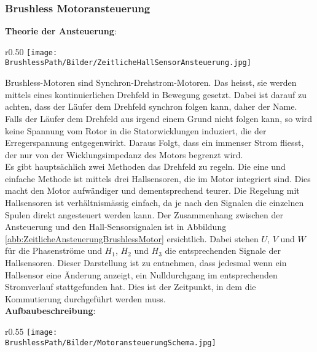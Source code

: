 \subsubsection{Brushless Motoransteuerung}
\textbf{Theorie der Ansteuerung}:\\
\begin{wrapfigure}{r}{0.50\textwidth}
	\texttt{[image: \\BrushlessPath/Bilder/ZeitlicheHallSensorAnsteuerung.jpg]}
	\caption[Zeitliche Darstellung der Ansteuerung mit Hall-Sensoren]{Zeitliche Darstellung der Ansteuerung mit Hall-Sensoren \cite{AppNote:BrushlessuC}}
	\centering
    \label{abb:ZeitlicheAnsteuerungBrushlessMotor}
\end{wrapfigure}
Brushless-Motoren sind Synchron-Drehstrom-Motoren. Das heisst, sie werden mittels eines kontinuierlichen Drehfeld in Bewegung gesetzt. Dabei ist darauf zu achten, dass der Läufer dem Drehfeld synchron folgen kann, daher der Name. Falls der Läufer dem Drehfeld aus irgend einem Grund nicht folgen kann, so wird keine Spannung vom Rotor in die Statorwicklungen induziert, die der Erregerspannung entgegenwirkt. Daraus Folgt, dass ein immenser Strom fliesst, der nur von der Wicklungsimpedanz des Motors begrenzt wird.\\
Es gibt hauptsächlich zwei Methoden das Drehfeld zu regeln. Die eine und einfache Methode ist mittels drei Hallsensoren, die im Motor integriert sind. Dies macht den Motor aufwändiger und dementsprechend teurer. Die Regelung mit Hallsensoren ist verhältnismässig einfach, da je nach den Signalen die einzelnen Spulen direkt angesteuert werden kann. Der Zusammenhang zwischen der Ansteuerung und den Hall-Sensorsignalen ist in Abbildung \ref{abb:ZeitlicheAnsteuerungBrushlessMotor} ersichtlich. Dabei stehen $U$, $V$ und $W$ für die Phasenströme und $H_1$, $H_2$ und $H_3$ die entsprechenden Signale der Hallsensoren. Dieser Darstellung ist zu entnehmen, dass jedesmal wenn ein Hallsensor eine Änderung anzeigt, ein Nulldurchgang im entsprechenden Stromverlauf stattgefunden hat. Dies ist der Zeitpunkt, in dem die Kommutierung durchgeführt werden muss.
\\
\textbf{Aufbaubeschreibung}:
\begin{wrapfigure}{r}{0.55\textwidth}
	\texttt{[image: \\BrushlessPath/Bilder/MotoransteuerungSchema.jpg]}
	\centering
	\caption{Schema des Brushless-Versuchsaufbaus}
\label{abb:MotoransteuerungSchema}
\end{wrapfigure}
